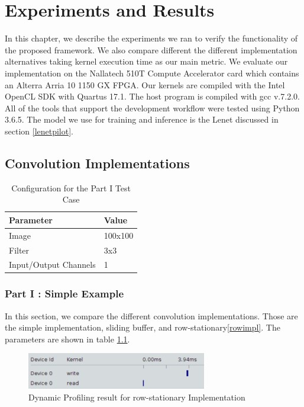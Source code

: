 
\chapter{Experiments and Results} %

\label{Chapter4} %

In this chapter, we describe the experiments we ran to verify the functionality of the proposed framework. We also compare different the different implementation alternatives taking kernel execution time as our main metric. We evaluate our implementation on the Nallatech 510T Compute Accelerator card which contains an Alterra Arria 10 1150 GX FPGA. Our kernels are compiled with the Intel OpenCL SDK with Quartus 17.1. The host program is compiled with gcc v.7.2.0. All of the tools that support the development workflow were tested using Python 3.6.5. 
The model we use for training and inference is the Lenet discussed in section \ref{lenetpilot}.


\section{Convolution Implementations}

\begin{table}[]
\centering
\begin{tabular}{|l|l|}
\hline
\textbf{Parameter}    & \textbf{Value} \\ \hline
Image                 & 100x100        \\ \hline
Filter                & 3x3            \\ \hline
Input/Output Channels & 1              \\ \hline
\end{tabular}
\caption{Configuration for the Part I Test Case}
\label{tab:partoneconfig}
\end{table}

\subsection{Part I : Simple Example} \label{testone}
In this section, we compare the different convolution implementations. Those are the simple implementation, sliding buffer, and row-stationary\ref{rowimpl}. The parameters are shown in table \ref{tab:partoneconfig}. 

\begin{figure}[h]
\centering
\includegraphics[width=0.7\textwidth]{Figures/profilerow}
\decoRule
\caption[profilerow]{ Dynamic Profiling result for row-stationary Implementation}
\label{fig:rowstatp}
\end{figure}


